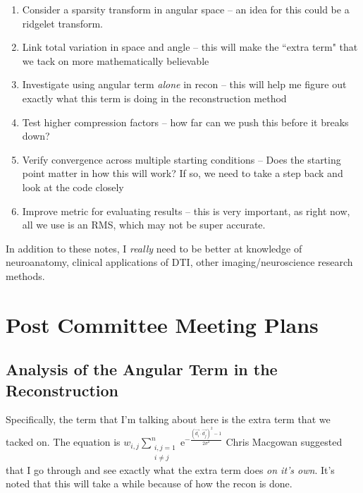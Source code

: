 \documentclass[11 pt]{article}
\newcommand{\me}{\mathrm{e}}
\let\oldsection\section
\renewcommand\section{\clearpage\newpage\oldsection}
\begin{document}
  \begin{enumerate}
    \item Consider a sparsity transform in angular space -- an idea for this could be a ridgelet transform.

    \item Link total variation in space and angle -- this will make the ``extra term" that we tack on more mathematically believable

    \item Investigate using angular term \emph{alone} in recon -- this will help me figure out exactly what this term is doing in the reconstruction method

    \item Test higher compression factors -- how far can we push this before it breaks down?

    \item Verify convergence across multiple starting conditions -- Does the starting point matter in how this will work? If so, we need to take a step back and look at the code closely

    \item Improve metric for evaluating results -- this is very important, as right now, all we use is an RMS, which may not be super accurate.
    \end{enumerate}
  
  In addition to these notes, I \emph{really} need to be better at knowledge of neuroanatomy, clinical applications of DTI, other imaging/neuroscience research methods.


\section{Post Committee Meeting Plans}

  \subsection{Analysis of the Angular Term in the Reconstruction}
    Specifically, the term that I'm talking about here is the extra term that we tacked on. The equation is $w_{i,j} \sum\limits_{\substack{i,j = 1 \\ i \neq j}}^n  \me^{{-\frac{(\vec{d_i}\cdot\vec{d_j})^2 - 1}{2\sigma^2}}}$ Chris Macgowan suggested that I go through and see exactly what the extra term does \emph{on it's own}. It's noted that this will take a while because of how the recon is done.
\end{document}
